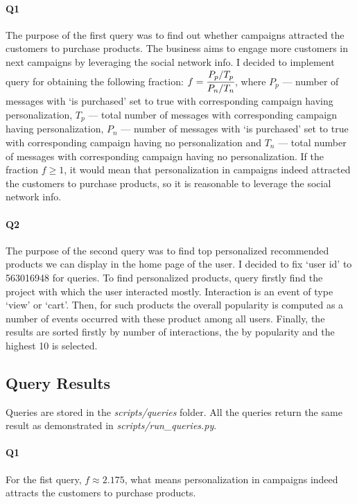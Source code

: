 \documentclass[conference]{IEEEtran}
\begin{document}
\paragraph{Q1} The purpose of the first query was to find out whether campaigns attracted the customers to purchase products. The business aims to engage more customers in next campaigns by leveraging the social network info. I decided to implement query for obtaining the following fraction: $f = \cfrac{P_p/T_p}{P_n/T_n}$, where $P_p$ --- number of messages with `is purchased' set to true with corresponding campaign having personalization, $T_p$ --- total number of messages with corresponding campaign having personalization, $P_n$ --- number of messages with `is purchased' set to true with corresponding campaign having no personalization and $T_n$ --- total number of messages  with corresponding campaign having no personalization. If the fraction $f \geq 1$, it would mean that personalization in campaigns indeed attracted the customers to purchase products, so it is reasonable to leverage the social network info.

\paragraph{Q2} The purpose of the second query was to find top personalized recommended products we can display in the home page of the user. I decided to fix `user id' to 563016948 for queries. To find personalized products, query firstly find the project with which the user interacted mostly. Interaction is an event of type `view' or `cart'. Then, for such products the overall popularity is computed as a number of events occurred with these product among all users. Finally, the results are sorted firstly by number of interactions, the by popularity and the highest 10 is selected.

\subsection{Query Results}

Queries are stored in the \textit{scripts/queries} folder. All the queries return the same result as demonstrated in \textit{scripts/run\_queries.py}.

\paragraph{Q1} For the fist query, $f \approx 2.175$, what means personalization in campaigns indeed attracts the customers to purchase products.
\end{document}
